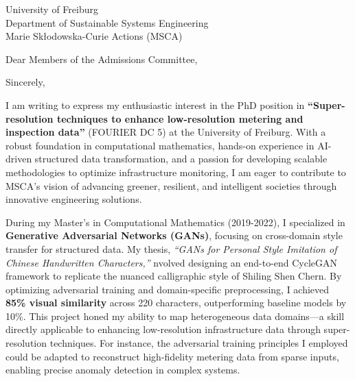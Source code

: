 \documentclass[11pt,a4paper, final]{moderncv}
\begin{document}
{University of Freiburg\\
Department of Sustainable Systems Engineering\\
Marie Skłodowska-Curie Actions (MSCA)
}
\date{\today}
\opening{Dear Members of the Admissions Committee,}
\closing{Sincerely,}
\makelettertitle
\thispagestyle{empty}
\pagestyle{empty}
I am writing to express my enthusiastic interest in the PhD position 
in \textbf{``Super-resolution techniques to enhance low-resolution metering and inspection data''} (FOURIER DC 5) 
at the University of Freiburg. 
With a robust foundation in computational mathematics, 
hands-on experience in AI-driven structured data transformation, 
and a passion for developing scalable methodologies to optimize infrastructure monitoring, 
I am eager to contribute to MSCA's vision of advancing greener, resilient, 
and intelligent societies through innovative engineering solutions.

During my Master's in Computational Mathematics (2019-2022), 
I specialized in \textbf{Generative Adversarial Networks (GANs)}, 
focusing on cross-domain style transfer for structured data. 
My thesis, \emph{``GANs for Personal Style Imitation of Chinese Handwritten Characters,''} 
nvolved designing an end-to-end CycleGAN framework to replicate the nuanced calligraphic style of Shiling Shen Chern. 
By optimizing adversarial training and domain-specific preprocessing, 
I achieved \textbf{85\% visual similarity} across 220 characters, outperforming baseline models by 10\%. 
This project honed my ability to map heterogeneous data domains—a skill directly applicable to enhancing low-resolution infrastructure data through super-resolution techniques.
For instance, the adversarial training principles I employed could be adapted to reconstruct high-fidelity metering data from sparse inputs, enabling precise anomaly detection in complex systems.
\end{document}
